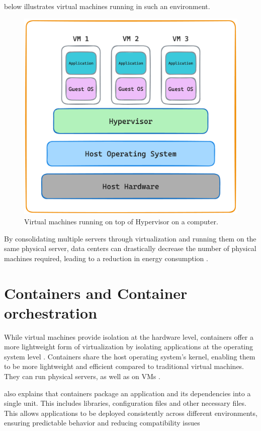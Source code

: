 \documentclass[
  table]{report}
\begin{document}
 below illustrates virtual machines running in such an
environment.

\begin{figure}[H]
\centering
  \includegraphics[width=0.7\columnwidth]{assets/3.2-vm-figure.png}
  \caption{Virtual machines running on top of Hypervisor on a computer.}
  \label{vm-figure}
\end{figure}

By consolidating multiple servers through virtualization and running
them on the same physical server, data centers can drastically decrease
the number of physical machines required, leading to a reduction in
energy consumption \citep{kaplanRevolutionizingDataCenter2008}.

\section{Containers and Container orchestration}
\label{sect:containers}

While virtual machines provide isolation at the hardware level,
containers offer a more lightweight form of virtualization by isolating
applications at the operating system level
\citep{merkelDockerLightweightLinux2014}. Containers share the host
operating system's kernel, enabling them to be more lightweight and
efficient compared to traditional virtual machines. They can run
physical servers, as well as on \ac{VMs}
\citep{bernsteinContainersCloudLXC2014}.

\citet{merkelDockerLightweightLinux2014} also explains that containers
package an application and its dependencies into a single unit. This
includes libraries, configuration files and other necessary files. This
allows applications to be deployed consistently across different
environments, ensuring predictable behavior and reducing compatibility
issues \citep{sergeevDockerContainerPerformance2022}
\end{document}
